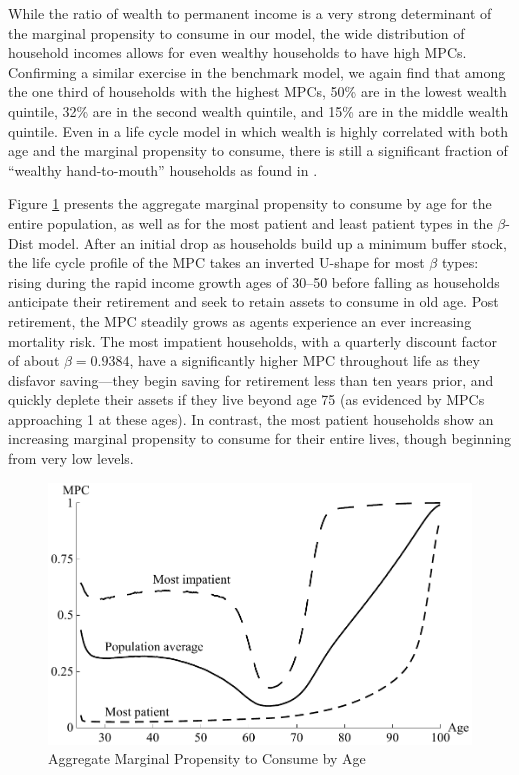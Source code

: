 \documentclass{econtex}\usepackage[pdftex]{graphicx}\usepackage{epstopdf} \usepackage[pdftex]{hyperref}
\newcommand{\Discount}{\ensuremath{\beta}}
\begin{document}
While the ratio of wealth to permanent income is a very strong determinant of the marginal propensity to consume in our model, the wide distribution of household incomes allows for even wealthy households to have high MPCs.  Confirming a similar exercise in the benchmark model, we again find that among the one third of households with the highest MPCs, 50\% are in the lowest wealth quintile, 32\% are in the second wealth quintile, and 15\% are in the middle wealth quintile.  Even in a life cycle model in which wealth is highly correlated with both age and the marginal propensity to consume, there is still a significant fraction of ``wealthy hand-to-mouth'' households as found in \cite{kaplanViolanteWeidner_wealthyH2M}.

Figure \ref{fig:MPCbyAge} presents the aggregate marginal propensity to consume by age for the entire population, as well as for the most patient and least patient types in the $\Discount$-Dist model.  After an initial drop as households build up a minimum buffer stock, the life cycle profile of the MPC takes an inverted U-shape for most $\Discount$ types: rising during the rapid income growth ages of 30--50 before falling as households anticipate their retirement and seek to retain assets to consume in old age.  Post retirement, the MPC steadily grows as agents experience an ever increasing mortality risk.  The most impatient households, with a quarterly discount factor of about $\beta = 0.9384$, have a significantly higher MPC throughout life as they disfavor saving---they begin saving for retirement less than ten years prior, and quickly deplete their assets if they live beyond age 75 (as evidenced by MPCs approaching 1 at these ages).  In contrast, the most patient households show an increasing marginal propensity to consume for their entire lives, though beginning from very low levels.

\begin{figure}
\caption{Aggregate Marginal Propensity to Consume by Age}
\label{fig:MPCbyAge}
\begin{center}
\includegraphics[scale=0.75]{../Figures/MPCbyAgeFigure}
\end{center}
\end{figure}
\end{document}
